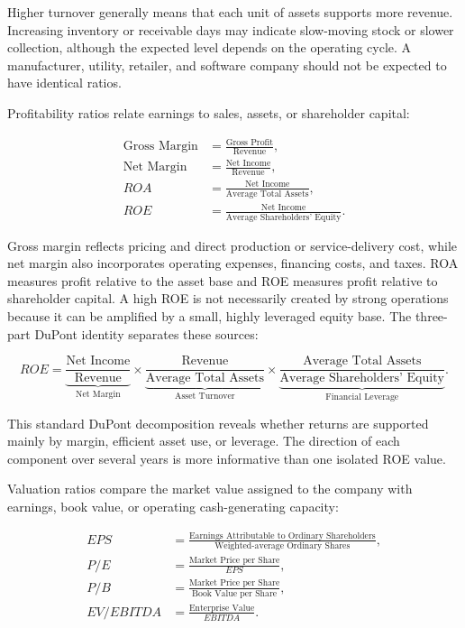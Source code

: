 Higher turnover generally means that each unit of assets supports more revenue. Increasing inventory or receivable days may indicate slow-moving stock or slower collection, although the expected level depends on the operating cycle. A manufacturer, utility, retailer, and software company should not be expected to have identical ratios.

Profitability ratios relate earnings to sales, assets, or shareholder capital:

\begin{align}
    \text{Gross Margin}
      &=\frac{\text{Gross Profit}}{\text{Revenue}}, \\
    \text{Net Margin}
      &=\frac{\text{Net Income}}{\text{Revenue}}, \\
    ROA&=\frac{\text{Net Income}}{\text{Average Total Assets}}, \\
    ROE&=\frac{\text{Net Income}}
              {\text{Average Shareholders' Equity}}.
    \label{eq:fundamental-profitability}
\end{align}

Gross margin reflects pricing and direct production or service-delivery cost, while net margin also incorporates operating expenses, financing costs, and taxes. ROA measures profit relative to the asset base and ROE measures profit relative to shareholder capital. A high ROE is not necessarily created by strong operations because it can be amplified by a small, highly leveraged equity base. The three-part DuPont identity separates these sources:

\begin{equation}
    ROE=
    \underbrace{\frac{\text{Net Income}}{\text{Revenue}}}_{\text{Net Margin}}
    \times
    \underbrace{\frac{\text{Revenue}}{\text{Average Total Assets}}}_{\text{Asset Turnover}}
    \times
    \underbrace{\frac{\text{Average Total Assets}}
                     {\text{Average Shareholders' Equity}}}_{\text{Financial Leverage}}.
    \label{eq:fundamental-dupont}
\end{equation}

This standard DuPont decomposition \cite{openstaxDupont2022} reveals whether returns are supported mainly by margin, efficient asset use, or leverage. The direction of each component over several years is more informative than one isolated ROE value.

Valuation ratios compare the market value assigned to the company with earnings, book value, or operating cash-generating capacity:

\begin{align}
    EPS
      &=\frac{\text{Earnings Attributable to Ordinary Shareholders}}
              {\text{Weighted-average Ordinary Shares}}, \\
    P/E&=\frac{\text{Market Price per Share}}{EPS}, \\
    P/B&=\frac{\text{Market Price per Share}}{\text{Book Value per Share}}, \\
    EV/EBITDA&=\frac{\text{Enterprise Value}}{EBITDA}.
    \label{eq:fundamental-valuation}
\end{align}

